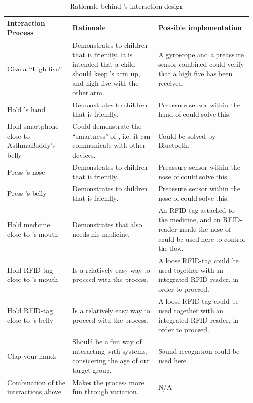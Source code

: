 \begin{singlespacing}
\begin{table}[H]
	\begin{tabular}{| p{3.0cm} | p{5.0cm} | p{5.0cm} |}
		\hline
		\textbf{Interaction Process} & \textbf{Rationale} & \textbf{Possible implementation} \\
		\hline
		Give \buddy{} a ``High five'' & Demonstrates to children that \buddy{} is friendly. It is intended that a child should keep \buddy{}'s arm up, and high five \buddy{} with the other arm. & A gyroscope and a preassure sensor combined could verify that a high five has been received. \\
		\hline
		Hold \buddy{}'s hand & Demonstrates to children that \buddy{} is friendly. & Preassure sensor within the hand of \buddy{} could solve this. \\
		\hline
		Hold smartphone close to AsthmaBuddy's belly & Could demonstrate the ``smartness'' of \buddy{}, i.e. it can communicate with other devices. & Could be solved by Bluetooth. \\
		\hline 
		Press \buddy{}'s nose & Demonstrates to children that \buddy{} is friendly. & Preassure sensor within the nose of \buddy{} could solve this. \\
		\hline
		Press \buddy{}'s belly & Demonstrates to children that \buddy{} is friendly. & Preassure sensor within the nose of \buddy{} could solve this. \\
		\hline
		Hold medicine close to \buddy{}'s mouth & Demonstrates that \buddy{} also needs his medicine. & An RFID-tag attached to the medicine, and an RFID-reader inside the nose of \buddy{} could be used here to control the flow. \\ 
		\hline
		Hold RFID-tag close to \buddy{}'s mouth & Is a relatively easy way to proceed with the process. & A loose RFID-tag could be used together with an integrated RFID-reader, in order to proceed. \\ 
		\hline
		Hold RFID-tag close to \buddy{}'s belly & Is a relatively easy way to proceed with the process. & A loose RFID-tag could be used together with an integrated RFID-reader, in order to proceed. \\
		\hline
		Clap your hands & Should be a fun way of interacting with systems, considering the age of our target group. & Sound recognition could be used here. \\ 
		\hline
		Combination of the interactions above & Makes the process more fun through variation. & N/A \\
		\hline
	\end{tabular}
	\label{tab:interaction-rationale}
	\caption{Rationale behind \buddy{}'s interaction design}
\end{table}
\end{singlespacing}

